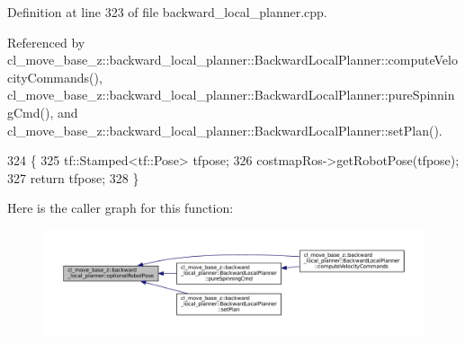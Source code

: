 Definition at line 323 of file backward\+\_\+local\+\_\+planner.\+cpp.



Referenced by cl\+\_\+move\+\_\+base\+\_\+z\+::backward\+\_\+local\+\_\+planner\+::\+Backward\+Local\+Planner\+::compute\+Velocity\+Commands(), cl\+\_\+move\+\_\+base\+\_\+z\+::backward\+\_\+local\+\_\+planner\+::\+Backward\+Local\+Planner\+::pure\+Spinning\+Cmd(), and cl\+\_\+move\+\_\+base\+\_\+z\+::backward\+\_\+local\+\_\+planner\+::\+Backward\+Local\+Planner\+::set\+Plan().


\begin{DoxyCode}
324         \{
325             tf::Stamped<tf::Pose> tfpose;
326             costmapRos->getRobotPose(tfpose);
327             \textcolor{keywordflow}{return} tfpose;
328         \}
\end{DoxyCode}
Here is the caller graph for this function\+:
\nopagebreak
\begin{figure}[H]
\begin{center}
\leavevmode
\includegraphics[width=350pt]{namespacecl__move__base__z_1_1backward__local__planner_afd5bb2a0d144f7b89f4215fbcb1fbe69_icgraph}
\end{center}
\end{figure}
